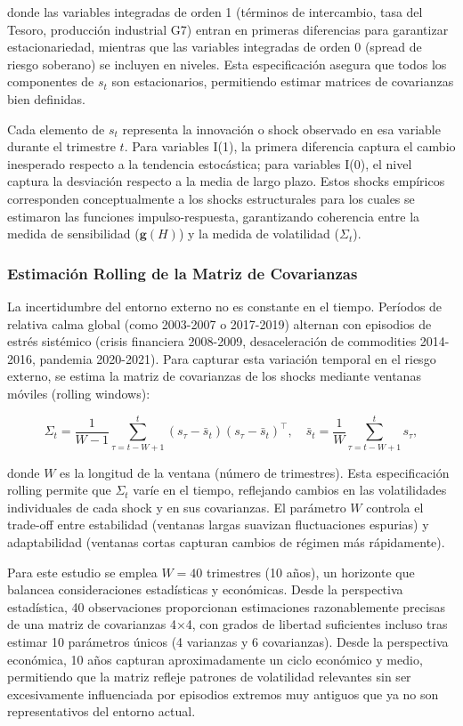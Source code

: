 \documentclass[3p,11pt,draft,natbib=false]{elsarticle}
\newcommand{\vect}[1]{\boldsymbol{#1}}
\begin{document}
donde las variables integradas de orden 1 (términos de intercambio, tasa del Tesoro, producción industrial G7) entran en primeras diferencias para garantizar estacionariedad, mientras que las variables integradas de orden 0 (spread de riesgo soberano) se incluyen en niveles. Esta especificación asegura que todos los componentes de $s_t$ son estacionarios, permitiendo estimar matrices de covarianzas bien definidas.

Cada elemento de $s_t$ representa la innovación o shock observado en esa variable durante el trimestre $t$. Para variables I(1), la primera diferencia captura el cambio inesperado respecto a la tendencia estocástica; para variables I(0), el nivel captura la desviación respecto a la media de largo plazo. Estos shocks empíricos corresponden conceptualmente a los shocks estructurales para los cuales se estimaron las funciones impulso-respuesta, garantizando coherencia entre la medida de sensibilidad ($\vect{g}(H)$) y la medida de volatilidad ($\Sigma_t$).

\subsubsection{Estimación Rolling de la Matriz de Covarianzas}

La incertidumbre del entorno externo no es constante en el tiempo. Períodos de relativa calma global (como 2003-2007 o 2017-2019) alternan con episodios de estrés sistémico (crisis financiera 2008-2009, desaceleración de commodities 2014-2016, pandemia 2020-2021). Para capturar esta variación temporal en el riesgo externo, se estima la matriz de covarianzas de los shocks mediante ventanas móviles (rolling windows):

\begin{equation}
\Sigma_t = \frac{1}{W-1} \sum_{\tau=t-W+1}^{t} (s_\tau - \bar{s}_t)(s_\tau - \bar{s}_t)^\top, \quad \bar{s}_t = \frac{1}{W} \sum_{\tau=t-W+1}^{t} s_\tau,
\label{eq:rolling_covariance}
\end{equation}

donde $W$ es la longitud de la ventana (número de trimestres). Esta especificación rolling permite que $\Sigma_t$ varíe en el tiempo, reflejando cambios en las volatilidades individuales de cada shock y en sus covarianzas. El parámetro $W$ controla el trade-off entre estabilidad (ventanas largas suavizan fluctuaciones espurias) y adaptabilidad (ventanas cortas capturan cambios de régimen más rápidamente).

Para este estudio se emplea $W=40$ trimestres (10 años), un horizonte que balancea consideraciones estadísticas y económicas. Desde la perspectiva estadística, 40 observaciones proporcionan estimaciones razonablemente precisas de una matriz de covarianzas 4×4, con grados de libertad suficientes incluso tras estimar 10 parámetros únicos (4 varianzas y 6 covarianzas). Desde la perspectiva económica, 10 años capturan aproximadamente un ciclo económico y medio, permitiendo que la matriz refleje patrones de volatilidad relevantes sin ser excesivamente influenciada por episodios extremos muy antiguos que ya no son representativos del entorno actual.
\end{document}
